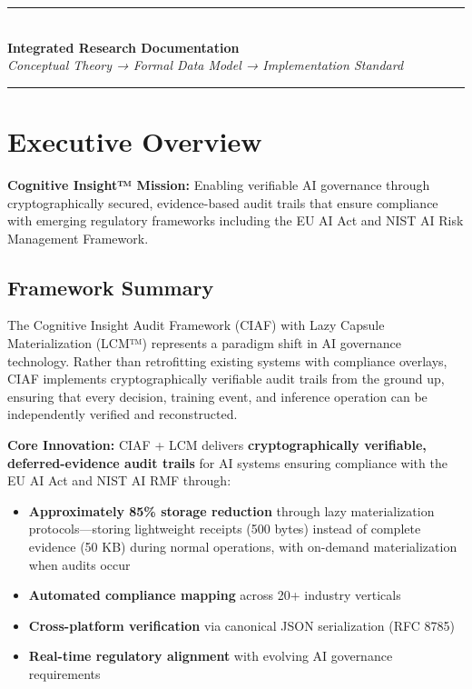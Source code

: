 \documentclass[12pt,a4paper]{article}
\begin{document}
\begin{titlepage}
\vfill

\begin{center}
\textcolor{ciafgray}{\rule{0.8\textwidth}{0.4pt}}\\
\vspace{0.5cm}
\textbf{\large Integrated Research Documentation}\\
\vspace{0.3cm}
\textit{Conceptual Theory → Formal Data Model → Implementation Standard}\\
\vspace{0.5cm}
\textcolor{ciafgray}{\rule{0.8\textwidth}{0.4pt}}
\end{center}

\vfill
\end{titlepage}

\tableofcontents
\newpage

\section{Executive Overview}

\begin{executivebox}
\textbf{Cognitive Insight™ Mission:} Enabling verifiable AI governance through cryptographically secured, evidence-based audit trails that ensure compliance with emerging regulatory frameworks including the EU AI Act and NIST AI Risk Management Framework.
\end{executivebox}

\subsection{Framework Summary}

The Cognitive Insight Audit Framework (CIAF) with Lazy Capsule Materialization (LCM™) represents a paradigm shift in AI governance technology. Rather than retrofitting existing systems with compliance overlays, CIAF implements cryptographically verifiable audit trails from the ground up, ensuring that every decision, training event, and inference operation can be independently verified and reconstructed.

\textbf{Core Innovation:} CIAF + LCM delivers \textbf{cryptographically verifiable, deferred-evidence audit trails} for AI systems ensuring compliance with the EU AI Act and NIST AI RMF through:

\begin{itemize}
\item \textbf{Approximately 85\% storage reduction} through lazy materialization protocols—storing lightweight receipts (500 bytes) instead of complete evidence (50 KB) during normal operations, with on-demand materialization when audits occur
\item \textbf{Automated compliance mapping} across 20+ industry verticals
\item \textbf{Cross-platform verification} via canonical JSON serialization (RFC 8785)
\item \textbf{Real-time regulatory alignment} with evolving AI governance requirements
\end{itemize}
\end{document}
